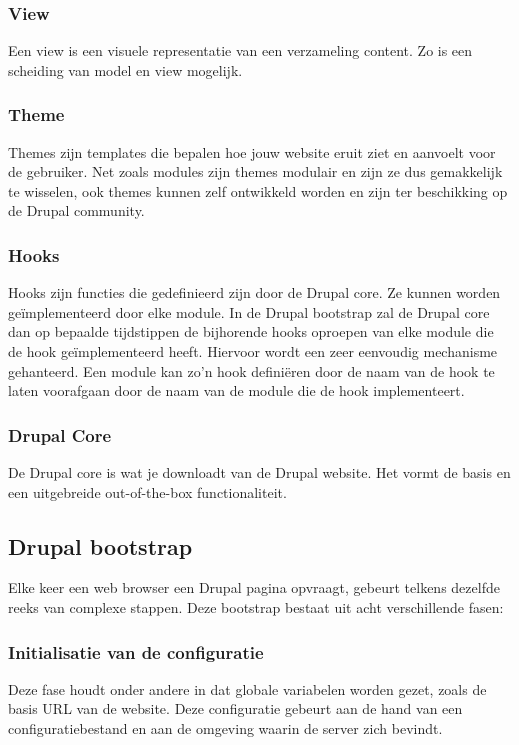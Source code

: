 \subsubsection{View}
Een view is een visuele representatie van een verzameling content. Zo is een scheiding van model en view mogelijk.

\subsubsection{Theme}
Themes zijn templates die bepalen hoe jouw website eruit ziet en aanvoelt voor de gebruiker. Net zoals modules zijn themes modulair en zijn ze dus gemakkelijk te wisselen, ook themes kunnen zelf ontwikkeld worden en zijn ter beschikking op de Drupal community.

\subsubsection{Hooks}
Hooks zijn functies die gedefinieerd zijn door de Drupal core. Ze kunnen worden ge\"{i}mplementeerd door elke module. In de Drupal bootstrap zal de Drupal core dan op bepaalde tijdstippen de bijhorende hooks oproepen van elke module die de hook ge\"{i}mplementeerd heeft. Hiervoor wordt een zeer eenvoudig mechanisme gehanteerd. Een module kan zo'n hook defini\"{e}ren door de naam van de hook te laten voorafgaan door de naam van de module die de hook implementeert.

\subsubsection{Drupal Core}
De Drupal core is wat je downloadt van de Drupal website. Het vormt de basis en een uitgebreide out-of-the-box functionaliteit.

\subsection{Drupal bootstrap}
Elke keer een web browser een Drupal pagina opvraagt, gebeurt telkens dezelfde reeks van complexe stappen. Deze bootstrap bestaat uit acht verschillende fasen:

\subsubsection{Initialisatie van de configuratie}
Deze fase houdt onder andere in dat globale variabelen worden gezet, zoals de basis URL van de website. Deze configuratie gebeurt aan de hand van een configuratiebestand en aan de omgeving waarin de server zich bevindt.

